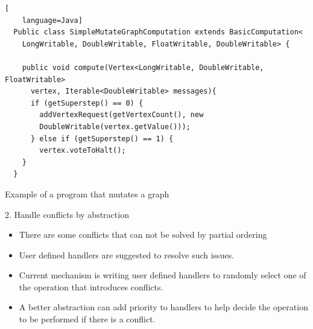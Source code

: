 \begin{frame}[fragile]
\begin{lstlisting}[
    language=Java]
  Public class SimpleMutateGraphComputation extends BasicComputation<
    LongWritable, DoubleWritable, FloatWritable, DoubleWritable> {

    public void compute(Vertex<LongWritable, DoubleWritable, FloatWritable>
      vertex, Iterable<DoubleWritable> messages){ 
      if (getSuperstep() == 0) {
      	addVertexRequest(getVertexCount(), new
      	DoubleWritable(vertex.getValue()));
      } else if (getSuperstep() == 1) {
        vertex.voteToHalt();
    } 
  }
\end{lstlisting}
Example of a program that mutates a graph
\end{frame}

\begin{frame}	

2. Handle conflicts by abstraction
		      \linebreak
		   	  \begin{itemize}
				\item There are some conflicts that can not be solved by partial ordering 
				\item User defined handlers are suggested to resolve such issues.
				\item Current mechanism is writing user defined handlers to randomly select one of the operation that introduces conflicts.
				\item A better abstraction can add priority to handlers to help decide the operation to be performed if there is a conflict.
		     	  \end{itemize}

\end{frame}


